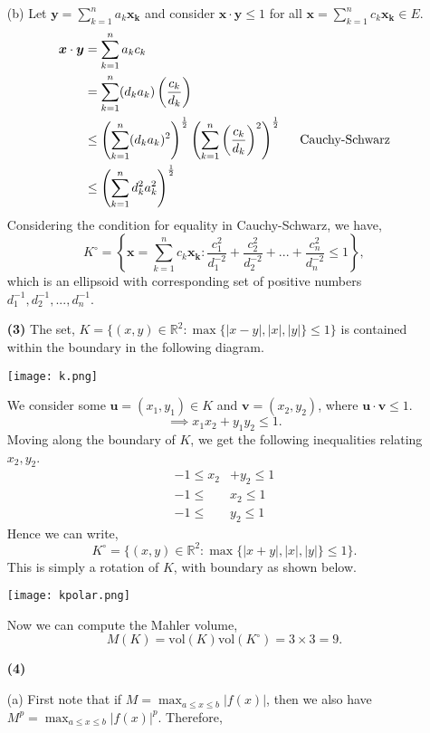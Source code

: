 \documentclass[a4paper]{article}
\begin{document}
\begin{enumerate}[leftmargin=\labelsep]
	\item[(b)]
		Let $\displaystyle \bm{y} = \sum_{k = 1}^n a_k\bm{x_k}$ and consider $\bm{x} \cdot \bm{y} \leq 1$ for all $\bm{x} = \sum_{k = 1}^n c_k \bm{x_k} \in E$.
		\begin{align*}
			\bm{x} \cdot \bm{y} & = \sum_{k = 1}^n a_kc_k \\
			& = \sum_{k = 1}^n (d_ka_k)\left(\frac{c_k}{d_k}\right) \\
			& \leq \left(\sum_{k = 1}^n (d_ka_k)^2\right)^{\frac{1}{2}} \left(\sum_{k = 1}^n \left(\frac{c_k}{d_k}\right)^2\right)^\frac{1}{2} \hspace{5mm} \text{Cauchy-Schwarz} \\
			& \leq \left(\sum_{k = 1}^n d_k^2a_k^2\right)^{\frac{1}{2}}
		\end{align*}
		Considering the condition for equality in Cauchy-Schwarz, we have,
		$$K^{\circ} = \left\{ \bm{x} = \sum_{k = 1}^n c_k \bm{x_k} : \frac{c_1^2}{d_1^{-2}} + \frac{c_2^2}{d_2^{-2}} + ... + \frac{c_n^2}{d_n^{-2}} \leq 1 \right\},$$
		which is an ellipsoid with corresponding set of positive numbers $d_1^{-1}, d_2^{-1}, ..., d_n^{-1}$.
	\item[\textbf{(3)}]
		The set,
		$K = \{(x,y) \in \mathbb{R}^2 : \max\{|x - y|, |x|, |y|\} \leq 1\}$
		is contained within the boundary in the following diagram.
		\begin{center}
			\texttt{[image: k.png]}
		\end{center}
		We consider some $\bm{u} = (x_1, y_1) \in K$ and $\bm{v} = (x_2, y_2)$, where $\bm{u} \cdot \bm{v} \leq 1$.
		$$\implies x_1x_2 + y_1y_2 \leq 1.$$
		Moving along the boundary of $K$, we get the following inequalities relating $x_2, y_2$.
		\begin{align*}
			-1 \leq x_2 & + y_2 \leq 1 \\
			-1 \leq & x_2 \leq 1 \\
			-1 \leq & y_2 \leq 1
		\end{align*}
		Hence we can write,
		$$K^{\circ} = \{(x,y) \in \mathbb{R}^2 : \max\{|x + y|, |x|, |y|\} \leq 1\}.$$
		This is simply a rotation of $K$, with boundary as shown below.
		\begin{center}
			\texttt{[image: kpolar.png]}
		\end{center}
		Now we can compute the Mahler volume,
		$$M(K) = \text{vol}(K) \text{vol}(K^{\circ}) = 3 \times 3 = 9.$$
	\item[\textbf{(4)}]
	\item[(a)]
		First note that if $\displaystyle M = \max_{a \leq x \leq b} |f(x)|$, then we also have $\displaystyle M^p = \max_{a \leq x \leq b} |f(x)|^p$. Therefore,

\end{enumerate}
\end{document}
